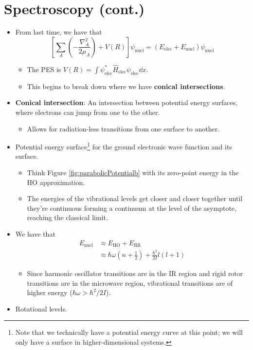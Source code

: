 \documentclass[../notes.tex]{subfiles}
\begin{document}
\section{Spectroscopy (cont.)}
\begin{itemize}
    \item {}From last time, we have that
    \begin{equation*}
        \left[ \sum_A\left( -\frac{\nabla_A^2}{2\mu_A} \right)+V(R) \right]\psi_\text{nucl} = (E_\text{elec}+E_\text{nucl})\psi_\text{nucl}
    \end{equation*}
    \begin{itemize}
        \item The PES is $V(R)=\int\psi_\text{elec}^*\hat{H}_\text{elec}\psi_\text{elec}\dd{x}$.
        \item This begins to break down where we have \textbf{conical intersections}.
    \end{itemize}
    \item \textbf{Conical intersection}: An intersection between potential energy surfaces, where electrons can jump from one to the other.
    \begin{itemize}
        \item Allows for radiation-less transitions from one surface to another.
    \end{itemize}
    \item Potential energy surface\footnote{Note that we technically have a potential energy curve at this point; we will only have a surface in higher-dimensional systems.} for the ground electronic wave function and its surface.
    \begin{itemize}
        \item Think Figure \ref{fig:parabolicPotentialb} with its zero-point energy in the HO approximation.
        \item The energies of the vibrational levels get closer and closer together until they're continuous forming a continuum at the level of the asymptote, reaching the classical limit.
    \end{itemize}
    \item We have that
    \begin{align*}
        E_\text{nucl} &\approx E_\text{HO}+E_\text{RR}\\
        &\approx \hbar\omega(n+\tfrac{1}{2})+\frac{\hbar^2}{2I}l(l+1)
    \end{align*}
    \begin{itemize}
        \item Since harmonic oscillator transitions are in the IR region and rigid rotor transitions are in the microwave region, vibrational transitions are of higher energy ($\hbar\omega>\hbar^2/2I$).
    \end{itemize}
    \item Rotational levels.
    \begin{figure}[h!]
        \centering
\end{figure}
\end{itemize}
\end{document}
